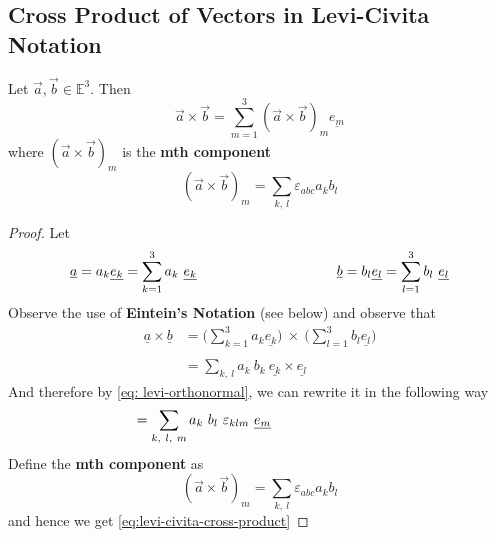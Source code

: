 \subsection{Cross Product of Vectors in Levi-Civita Notation}
\begin{theorem}
	Let $\vec{a}, \vec{b} \in \mathbb{E}^3$. Then
	\begin{equation}
		\label{eq:levi-civita-cross-product}
		\vec{a} \times \vec{b} = \sum_{m=1}^{3}(\vec{a} \times \vec{b})_{m}\underline{e_m}
	\end{equation}
	where $(\vec{a} \times \vec{b})_m$ is the {\bf mth component}
	\begin{equation}
		\label{eq: mth-component}
		(\vec{a} \times \vec{b})_m = \sum_{k, \ l}\varepsilon_{abc}a_{k}b_{l}
	\end{equation}
\end{theorem}
\begin{proof}
	Let
	$$
		\underline{a} = a_{k}\underline{e_{k}} = \sum_{k=1}^{3}a_{k}\ \underline{e_{k}} \hspace{100px} \underline{b} = b_{l}\underline{e_{l}}= \sum\limits_{l=1}^{3} b_{l}\ \underline{e_{l}}
	$$
	Observe the use of {\bf Eintein's Notation} (see below) and observe that
	\begin{align*}
		\underline{a} \times \underline{b} & = \Big( \sum\limits_{k = 1}^{3}a_k\underline{e_{k}} \Big)\ \times \ \Big( \sum\limits_{l = 1}^{3}b_l\underline{e_{l}} \Big) \\ \\
		                                   & = \sum\limits_{k, \ l}a_{k} \ b_{k} \ \underline{e_{k}} \times \underline{e_{l}}
	\end{align*}
	And therefore by \ref{eq: levi-orthonormal}, we can rewrite it in the following way
	$$\hspace{-80px} = \sum\limits_{k,\ l,\ m} a_{k} \ b_{l} \ \epsilon_{klm} \ \underline{e_m}$$
	Define the {\bf mth component} as
	$$(\vec{a} \times \vec{b})_m =  \sum_{k, \ l}\varepsilon_{abc}a_{k}b_{l}$$
	and hence we get \ref{eq:levi-civita-cross-product}
\end{proof}
